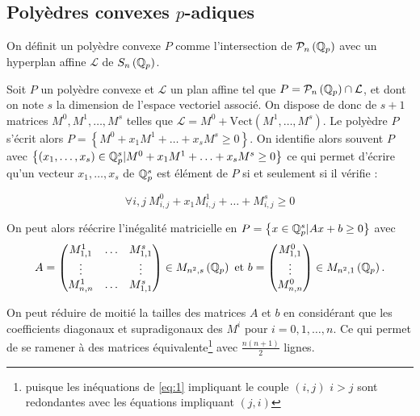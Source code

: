 \subsection{Polyèdres convexes \texorpdfstring{$p$}{p}-adiques} 

\begin{definition}
	
On définit un polyèdre convexe $P$ comme l'intersection de $\mathcal{P}_n \left( \mathbb{Q}_p \right)$ avec un hyperplan affine $\mathcal{L} $ de $S_n\left( \mathbb{Q}_p \right) $. 
\end{definition}

Soit $P$ un polyèdre convexe et $\mathcal{L} $ un plan affine tel que $P = \mathcal{P}_n \left( \mathbb{Q}_p \right) \cap \mathcal{L}$, et dont on note $s$ la dimension de l'espace vectoriel associé. On dispose de donc de $s +1 $ matrices $M^0,M^1,\ldots, M^s$ telles que $\mathcal{L} = M^0 + \text{Vect}\left( M^1,\ldots,M^s \right)$. Le polyèdre $P$ s'écrit alors $P = \left\{ M^0 + x_1 M^1 + \ldots + x_s M^s \ge 0 \right\}$. On identifie alors souvent $P$ avec $\left\{ \left( x_1,\ldots,x_s \right) \in \mathbb{Q}_p^s |M^0 + x_1 M^1 + \ldots + x_s M^s \ge 0 \right\}$ ce qui permet d'écrire qu'un vecteur $x_1,\ldots,x_s$ de $\mathbb{Q}_p^s$ est élément de $P$ si et seulement si il vérifie :
 
	\begin{equation}
	\label{eq:1} 
\forall i,j ~  M^0_{i,j} + x_1 M^1_{i,j} + \ldots + M^s_{i,j} \ge 0
	\end{equation}

On peut alors réécrire l'inégalité matricielle en  $P = \left\{ x \in \mathbb{Q}_p^s \-| Ax + b \ge 0 \right\} $ avec 
\[A = \begin{pmatrix} M^1_{1,1} & \ldots & M^s_{1,1} \\
\vdots & & \vdots \\
M^1_{n,n} & \ldots & M^s_{1,1}\\ \end{pmatrix} \in M_{n^2,s}\left( \mathbb{Q}_p \right) \text{ et } 
b = \begin{pmatrix} M^0_{1,1} \\
\vdots\\
M^0_{n,n} \end{pmatrix} \in M_{n^2, 1}\left( \mathbb{Q}_p \right) 
.\]  
\begin{remarque}
	On peut réduire de moitié la tailles des matrices $A$ et $b$ en considérant que les coefficients diagonaux et supradigonaux des $M^i$ pour $i = 0,1,\ldots,n$. Ce qui permet de se ramener à des matrices équivalente\footnote{puisque les inéquations de \ref{eq:1} impliquant le couple $(i,j)$ $i>j$ sont redondantes avec les équations impliquant $(j,i)$}  avec $\frac{n(n+1)}{2}$ lignes.  
\end{remarque}

